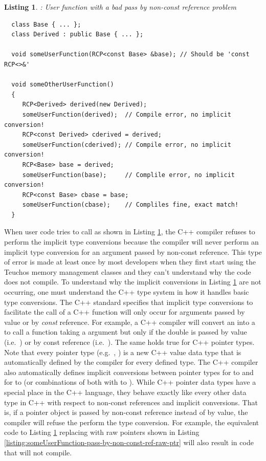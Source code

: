 \documentclass[pdf,ps2pdf,11pt]{SANDreport}
\newtheorem{listing}{Listing}
\begin{document}
{}\begin{listing}: User function with a bad pass by non-const
reference problem
\label{listing:someUserFunction-pass-by-non-const-ref}
{\small\begin{verbatim}
  class Base { ... };
  class Derived : public Base { ... };

  void someUserFunction(RCP<const Base> &base); // Should be 'const RCP<>&'

  void someOtherUserFunction()
  {
     RCP<Derived> derived(new Derived);
     someUserFunction(derived);  // Compile error, no implicit conversion!
     RCP<const Derived> cderived = derived;
     someUserFunction(cderived); // Compile error, no implicit conversion!
     RCP<Base> base = derived;
     someUserFunction(base);     // Complile error, no implicit conversion!
     RCP<const Base> cbase = base;
     someUserFunction(cbase);    // Compliles fine, exact match!
  }
\end{verbatim}}
\end{listing}


When user code tries to call {} as shown in
Listing {}\ref{listing:someUserFunction-pass-by-non-const-ref}, the
C++ compiler refuses to perform the implicit type conversions because
the compiler will never perform an implicit type conversion for an
argument passed by non-const reference.  This type of error is made at
least once by most developers when they first start using the Teuchos
memory management classes and they can't understand why the code does
not compile.  To understand why the implicit conversions in Listing
{}\ref{listing:someUserFunction-pass-by-non-const-ref} are not
occurring, one must understand the C++ type system in how it handles
basic type conversions.  The C++ standard specifies that implicit type
conversions to facilitate the call of a C++ function will only occur
for arguments passed by value or by {}\textit{const} reference.  For
example, a C++ compiler will convert an {} into a
{} to call a function taking a {} argument but
only if the double is passed by value (i.e.\ {}) or by
const reference (i.e.\ {}).  The same holds true
for C++ pointer types.  Note that every pointer type (e.g.\
{}, {}) is a new C++ value data type that is
automatically defined by the compiler for every defined type.  The C++
compiler also automatically defines implicit conversions between
pointer types for {}\ttt{T*} to {}\ttt{const T*} and for {}
to {} (or combinations of both with {}\ttt{Derived*} to
{}\ttt{const Derived*}).  While C++ pointer data types have a special
place in the C++ language, they behave exactly like every other data
type in C++ with respect to non-const references and implicit
conversions.  That is, if a pointer object is passed by non-const
reference instead of by value, the compiler will refuse the perform
the type conversion.  For example, the equivalent code to Listing
{}\ref{listing:someUserFunction-pass-by-non-const-ref} replacing
{}\ttt{RCP} with raw pointers shown in Listing
{}\ref{listing:someUserFunction-pass-by-non-const-ref-raw-ptr} will
also result in code that will not compile.
\end{document}
